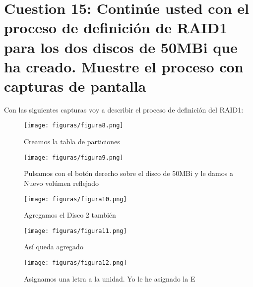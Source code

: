 \section{Cuestion 15: Continúe usted con el proceso de definición de RAID1 para los dos discos de 50MBi que ha creado. Muestre el proceso con capturas de pantalla}
Con las siguientes capturas voy a describir el proceso de definición del RAID1:
\begin{figure}[H] %
	\centering
	\texttt{[image: figuras/figura8.png]}  %
	\label{figura8}
	
	\caption{Creamos la tabla de particiones} 
\end{figure}
\begin{figure}[H] %
	\centering
	\texttt{[image: figuras/figura9.png]}  %
	\label{figura9}
	
	\caption{Pulsamos con el botón derecho sobre el disco de 50MBi y le damos a Nuevo volúmen reflejado} 
\end{figure}
\begin{figure}[H] %
	\centering
	\texttt{[image: figuras/figura10.png]}  %
	\label{figura10}
	
	\caption{Agregamos el Disco 2 también} 
\end{figure}
\begin{figure}[H] %
	\centering
	\texttt{[image: figuras/figura11.png]}  %
	\label{figura11}
	
	\caption{Así queda agregado} 
\end{figure}
\begin{figure}[H] %
	\centering
	\texttt{[image: figuras/figura12.png]}  %
	\label{figura12}
	
	\caption{Asignamos una letra a la unidad. Yo le he asignado la E} 
\end{figure}
